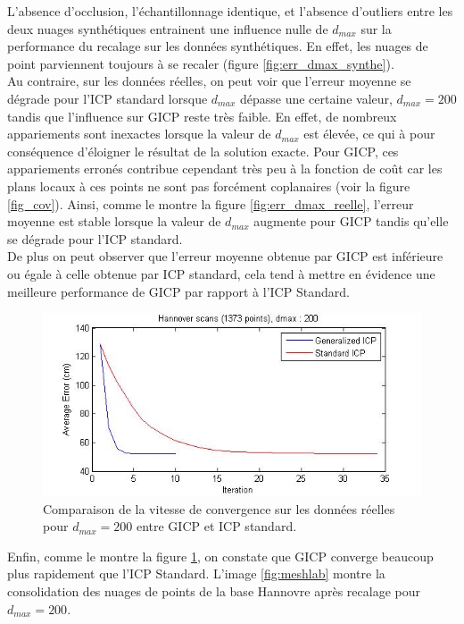 L'absence d'occlusion, l'échantillonnage identique, et l'absence d'outliers entre les deux nuages synthétiques entrainent une influence nulle de $d_{max}$ sur la performance du recalage sur les données synthétiques. En effet, les nuages de point parviennent toujours à se recaler (figure \ref{fig:err_dmax_synthe}).\\

Au contraire, sur les données réelles, on peut voir que l'erreur moyenne se dégrade pour l'ICP standard lorsque $d_{max}$ dépasse une certaine valeur, $d_{max}=200$ tandis que l'influence sur GICP reste très faible. En effet, de nombreux appariements sont inexactes lorsque la valeur de $d_{max}$ est élevée, ce qui à pour conséquence d'éloigner le résultat de la solution exacte. Pour GICP, ces appariements erronés contribue cependant très peu à la fonction de coût car les plans locaux à ces points ne sont pas forcément coplanaires (voir la figure \ref{fig_cov}). Ainsi, comme le montre la figure \ref{fig:err_dmax_reelle}, l'erreur moyenne est stable lorsque la valeur de $d_{max}$ augmente pour GICP tandis qu'elle se dégrade pour l'ICP standard.\\

De plus on peut observer que l'erreur moyenne obtenue par GICP est inférieure ou égale à celle obtenue par ICP standard, cela tend à mettre en évidence une meilleure performance de GICP par rapport à l'ICP Standard.\\

\begin{figure}[!h]
     \centering
     \includegraphics[scale=0.4]{Images/Resultats/hannover_dmax200_diffconvergence.jpg}
     \caption{Comparaison de la vitesse de convergence sur les données réelles pour $d_{max}=200$ entre GICP et ICP standard.}
	\label{fig:GICP_convergence}
\end{figure}

Enfin, comme le montre la figure \ref{fig:GICP_convergence}, on constate que GICP converge beaucoup plus rapidement que l'ICP Standard. L'image \ref{fig:meshlab} montre la consolidation des nuages de points de la base Hannovre après recalage pour $d_{max} = 200$.




